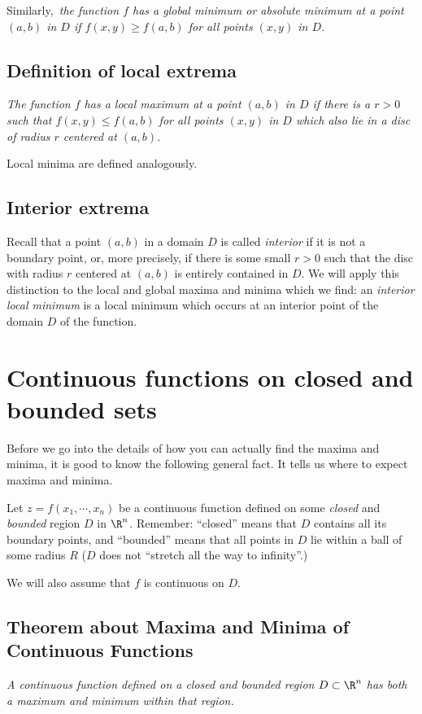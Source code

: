 \upshape%
Similarly,\itshape\ the function $f$ has a
\emph{global minimum} or \emph{absolute minimum} at a point $(a,b)$ in $D$
if $f(x,y)\geq f(a,b)$ for all points $(x,y)$ in $D$.

\subsection{Definition of local extrema}  %

\label{sec:def-local-extrema}\itshape 
The function $f$ has a \emph{local maximum} at a point $(a,b)$ in $D$ if
there is a $r>0$ such that $f(x,y)\leq f(a,b)$ for all points $(x,y)$ in
$D$ which also lie in a disc of radius $r$ centered at $(a,b)$.
\upshape

Local minima are defined analogously.

\subsection{Interior extrema}  %

\label{sec:interior-extrema} 
Recall that a point $(a,b)$ in a domain $D$ is called \emph{interior} if it
is not a boundary point, or, more precisely, if there is some small $r>0$
such that the disc with radius $r$ centered at $(a,b)$ is entirely
contained in $D$.  We will apply this distinction to the local and global
maxima and minima which we find: an \emph{interior local minimum} is a
local minimum which occurs at an interior point of the domain $D$ of the
function.


\section{Continuous functions on closed and bounded sets}  %
Before we go into the details of how you can actually find the maxima and
minima, it is good to know the following general fact. It tells us where to
expect maxima and minima.

Let $z=f(x_1,\cdots,x_n)$ be a continuous function defined on some
\emph{closed} and \emph{bounded} region $D$ in $\R^n$.  Remember:
``closed'' means that $D$ contains all its boundary points, and ``bounded''
means that all points in $D$ lie within a ball of some radius $R$ ($D$ does
not ``stretch all the way to infinity''.)

We will also assume that $f$ is continuous on $D$.

\subsection{Theorem about Maxima and Minima of Continuous Functions}  %
\label{thm:03maxmin-exist}%
\itshape%
A continuous function defined on a closed and bounded region $D\subset
\R^n$ has both a maximum and minimum within that region.  \upshape

